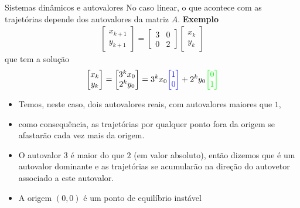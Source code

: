 \documentclass{beamer}
\begin{document}
\begin{frame}{Sistemas dinâmicos e autovalores}
  No caso linear, o que acontece com as trajetórias depende
  dos autovalores da matriz $A$.
  \textbf{Exemplo}
  \begin{gather*}
    \begin{bmatrix}
      x_{k+1} \\ y_{k+1} 
    \end{bmatrix} = \begin{bmatrix}
      3 & 0 \\ 0 & 2
    \end{bmatrix}\begin{bmatrix}
      x_k \\ y_k
    \end{bmatrix}
  \end{gather*}
  que tem a solução
  \begin{gather*}
    \begin{bmatrix}
      x_k \\ y_k 
    \end{bmatrix} =\begin{bmatrix}
      3^kx_0 \\ 2^k y_0
    \end{bmatrix} = 3^kx_0\textcolor{blue}{\begin{bmatrix}
      1 \\ 0
    \end{bmatrix}} + 2^k y_0 \textcolor{green}{\begin{bmatrix}
      0 \\ 1
    \end{bmatrix}}
  \end{gather*}
  
\end{frame}

\begin{frame}
  \begin{itemize}
  \item Temos, neste caso, dois autovalores reais, com autovalores 
  maiores que $1$, 

  \item como consequência, as trajetórias por 
  qualquer ponto fora da origem se afastarão cada vez mais da origem.

  \item O autovalor $3$ é maior do que $2$ (em valor absoluto),
  então dizemos que é um autovalor dominante e as trajetórias
  se acumularão na direção do autovetor associado a este autovalor.

  \item A origem $(0,0)$ é um ponto de equilíbrio instável
\end{itemize}
\end{frame}
\end{document}
